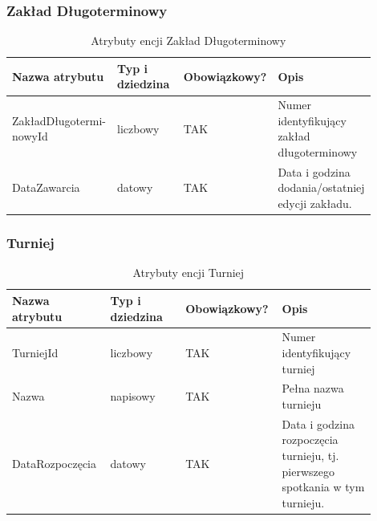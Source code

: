 \documentclass{mwrep}
\begin{document}
\vspace{1cm}

\subsubsection{Zakład Długoterminowy}
\begin{table}[H]
	\begin{tabular}{|p{0.25\linewidth}|p{0.2\linewidth}|p{0.2\linewidth}|p{0.25\linewidth}|}
	\hline
	Nazwa atrybutu & Typ i dziedzina & Obowiązkowy? & Opis                                                           \\ \hline
	ZakładDługotermi- nowyId   & liczbowy                            & TAK                              & Numer identyfikujący zakład długoterminowy                                                  \\ \hline
	DataZawarcia          & datowy                            & TAK                              & Data i godzina dodania/ostatniej edycji zakładu.       \\ \hline
	\end{tabular}
	\caption{Atrybuty encji Zakład Długoterminowy}
\end{table}

\newpage

\subsubsection{Turniej}
\begin{table}[H]
	\begin{tabular}{|p{0.25\linewidth}|p{0.2\linewidth}|p{0.2\linewidth}|p{0.25\linewidth}|}
	\hline
	Nazwa atrybutu & Typ i dziedzina & Obowiązkowy? & Opis                                                           \\ \hline
	TurniejId   & liczbowy                            & TAK                              & Numer identyfikujący turniej  \\ \hline
	Nazwa   & napisowy                            & TAK                              & Pełna nazwa turnieju  \\ \hline
	DataRozpoczęcia          & datowy                            & TAK                              & Data i godzina rozpoczęcia turnieju, tj. pierwszego spotkania w tym turnieju.       \\ \hline
	\end{tabular}
	\caption{Atrybuty encji Turniej}
\end{table}
\end{document}
